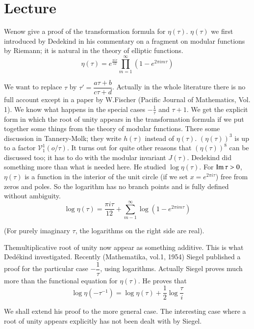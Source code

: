 \chapter{Lecture}\label{part3:lec27}%

We\pageoriginale now give a proof of the transformation formula for
$\eta(\tau)$. $\eta(\tau)$ we first introduced by Dedekind in his
commentary on a fragment on modular functions by Riemann; it is
natural in the theory of elliptic functions.
$$
\eta (\tau) = e^{\frac{\pi i \tau}{12}} \prod^\infty_{m=1} (1- e^{2
  \pi i m \tau})
$$ 

We want to replace $\tau$ by $\tau' = \dfrac{a \tau+b}{c \tau
  +d}$. Actually in the whole literature there is no full account
except in a paper by W.Fischer (Pacific Journal of Mathematics,
Vol. 1). We know what happens in the special cases $- \frac{1}{\tau}$
and $\tau+1$. We get the explicit form in which the root of unity
appears in the transformation formula if we put together some things
from the theory of modular functions. There some discussion in
Tannery-Molk; they write $h(\tau)$ instead of
$\eta(\tau)$. $(\eta(\tau))^3$ is up to a factor $\mathscr{V}_1^1 (o
/\tau)$. It turns out for quite other reasons that $(\eta (\tau))^8$
can be discussed too; it has to do with the modular invariant
$J(\tau)$. Dedekind did something more than what is needed
here. He studied $\log \eta(\tau)$. For $\operatorname{Im} \tau > 0$, $\eta(\tau)$
is a function in the interior of the unit circle (if we set $x= e^{2
  \pi i \tau}$) free from zeros and poles. So the logarithm has no
branch points and is fully defined without ambiguity.
$$
\log \eta(\tau) = \frac{\pi i \tau}{12} + \sum^\infty_{m-1} \log (1-
e^{2 \pi i m \tau})
$$ 

(For purely imaginary $\tau$, the logarithms on the right side are
real). 

The\pageoriginale multiplicative root of unity now appear as
something additive. This is what Ded\'ekind investigated. Recently
(Mathematika, vol.1, 1954) Siegel published a proof for the particular
case $-\dfrac{1}{\tau}$, using logarithms. Actually Siegel proves much
more than the functional equation for $\eta(\tau)$. He proves that
$$
\log \eta (- \tau^{-1})= \log \eta (\tau)+ \frac{1}{2} \log \frac{\tau}{i}
$$ 

We shall extend his proof to the more general case. The interesting
case where a root of unity appears explicitly has not been dealt with
by Siegel.


